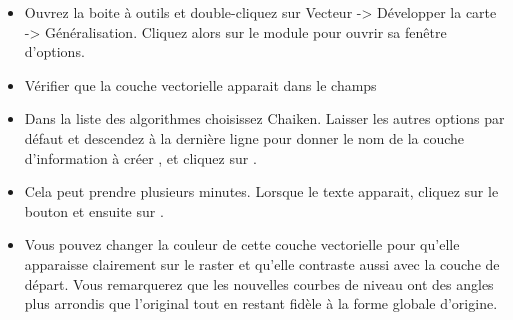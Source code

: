 {\begin{itemize}[label=--]
\item Ouvrez la boite à outils \grass et double-cliquez sur Vecteur -> Développer la carte -> Généralisation. Cliquez alors sur le module  pour ouvrir sa fenêtre d'options.
\item Vérifier que la couche vectorielle  apparait dans le champs\\ 
\item Dans la liste des algorithmes choisissez Chaiken. Laisser les autres options par défaut et descendez à la dernière ligne pour donner le nom de la couche d'information à créer , et cliquez sur .
\item Cela peut prendre plusieurs minutes. Lorsque le texte  apparait, cliquez sur le bouton  et ensuite sur .
\item Vous pouvez changer la couleur de cette couche vectorielle pour qu'elle apparaisse clairement sur le raster et qu'elle contraste aussi avec la couche de départ. Vous remarquerez que les nouvelles courbes de niveau ont des angles plus arrondis que l'original tout en restant fidèle à la forme globale d'origine.
\end{itemize}

}
